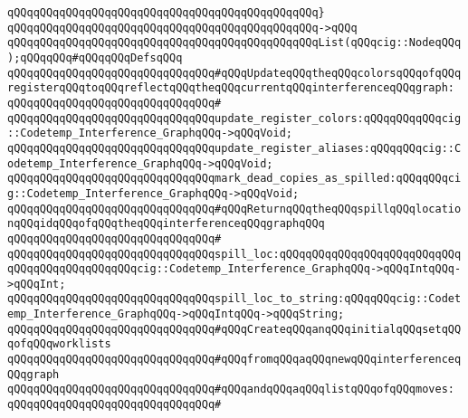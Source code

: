 \verb|qQQqqQQqqQQqqQQqqQQqqQQqqQQqqQQqqQQqqQQqqQQqqQQq}|\newline
\verb|qQQqqQQqqQQqqQQqqQQqqQQqqQQqqQQqqQQqqQQqqQQqqQQq->qQQq|\newline
\verb|qQQqqQQqqQQqqQQqqQQqqQQqqQQqqQQqqQQqqQQqqQQqqQQqList(qQQqcig::NodeqQQq);qQQqqQQq#qQQqqQQqDefsqQQq|\newline
\newline
\newline
\verb|qQQqqQQqqQQqqQQqqQQqqQQqqQQqqQQq#qQQqUpdateqQQqtheqQQqcolorsqQQqofqQQqregisterqQQqtoqQQqreflectqQQqtheqQQqcurrentqQQqinterferenceqQQqgraph:|\newline
\verb|qQQqqQQqqQQqqQQqqQQqqQQqqQQqqQQq#|\newline
\verb|qQQqqQQqqQQqqQQqqQQqqQQqqQQqqQQqupdate_register_colors:qQQqqQQqqQQqcig::Codetemp_Interference_GraphqQQq->qQQqVoid;|\newline
\verb|qQQqqQQqqQQqqQQqqQQqqQQqqQQqqQQqupdate_register_aliases:qQQqqQQqcig::Codetemp_Interference_GraphqQQq->qQQqVoid;|\newline
\newline
\verb|qQQqqQQqqQQqqQQqqQQqqQQqqQQqqQQqmark_dead_copies_as_spilled:qQQqqQQqcig::Codetemp_Interference_GraphqQQq->qQQqVoid;|\newline
\newline
\newline
\verb|qQQqqQQqqQQqqQQqqQQqqQQqqQQqqQQq#qQQqReturnqQQqtheqQQqspillqQQqlocationqQQqidqQQqofqQQqtheqQQqinterferenceqQQqgraphqQQq|\newline
\verb|qQQqqQQqqQQqqQQqqQQqqQQqqQQqqQQq#|\newline
\verb|qQQqqQQqqQQqqQQqqQQqqQQqqQQqqQQqspill_loc:qQQqqQQqqQQqqQQqqQQqqQQqqQQqqQQqqQQqqQQqqQQqqQQqcig::Codetemp_Interference_GraphqQQq->qQQqIntqQQq->qQQqInt;|\newline
\verb|qQQqqQQqqQQqqQQqqQQqqQQqqQQqqQQqspill_loc_to_string:qQQqqQQqcig::Codetemp_Interference_GraphqQQq->qQQqIntqQQq->qQQqString;|\newline
\newline
\newline
\verb|qQQqqQQqqQQqqQQqqQQqqQQqqQQqqQQq#qQQqCreateqQQqanqQQqinitialqQQqsetqQQqofqQQqworklists|\newline
\verb|qQQqqQQqqQQqqQQqqQQqqQQqqQQqqQQq#qQQqfromqQQqaqQQqnewqQQqinterferenceqQQqgraph|\newline
\verb|qQQqqQQqqQQqqQQqqQQqqQQqqQQqqQQq#qQQqandqQQqaqQQqlistqQQqofqQQqmoves:|\newline
\verb|qQQqqQQqqQQqqQQqqQQqqQQqqQQqqQQq#|\newline
